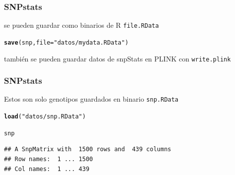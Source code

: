 \documentclass{beamer}\usepackage[]{graphicx}\usepackage[]{color}
\makeatletter
\newcommand{\hlstr}[1]{\textcolor[rgb]{0.192,0.494,0.8}{#1}}%
\newcommand{\hlstd}[1]{\textcolor[rgb]{0.345,0.345,0.345}{#1}}%
\newcommand{\hlkwc}[1]{\textcolor[rgb]{0.333,0.667,0.333}{#1}}%
\newcommand{\hlkwd}[1]{\textcolor[rgb]{0.737,0.353,0.396}{\textbf{#1}}}%
\newenvironment{kframe}{%
 \def\at@end@of@kframe{}%
 \ifinner\ifhmode%
  \def\at@end@of@kframe{\end{minipage}}%
  \begin{minipage}{\columnwidth}%
 \fi\fi%
 \def\FrameCommand##1{\hskip\@totalleftmargin \hskip-\fboxsep
 \colorbox{shadecolor}{##1}\hskip-\fboxsep
     \hskip-\linewidth \hskip-\@totalleftmargin \hskip\columnwidth}%
 \MakeFramed {\advance\hsize-\width
   \@totalleftmargin\z@ \linewidth\hsize
   \@setminipage}}%
 {\par\unskip\endMakeFramed%
 \at@end@of@kframe}
\newenvironment{knitrout}{}{} %
\makeatother
\begin{document}
\begin{frame}[fragile]
\frametitle{SNPstats}
se pueden guardar como binarios de R {\tt file.RData}
\begin{knitrout}\footnotesize
{}\color{fgcolor}\begin{kframe}
\begin{alltt}
\hlkwd{save}\hlstd{(snp,} \hlkwc{file}\hlstd{=}\hlstr{"datos/mydata.RData"}\hlstd{)}
\end{alltt}
\end{kframe}
\end{knitrout}

tambi\'en se pueden guardar datos de snpStats en PLINK con {\tt write.plink}
\end{frame}


\begin{frame}[fragile]
\frametitle{SNPstats}

Estos son solo genotipos guardados en binario {\tt snp.RData} 
\begin{knitrout}\footnotesize
{}\color{fgcolor}\begin{kframe}
\begin{alltt}
\hlkwd{load}\hlstd{(}\hlstr{"datos/snp.RData"}\hlstd{)}
\end{alltt}
\end{kframe}
\end{knitrout}

\begin{knitrout}\footnotesize
{}\color{fgcolor}\begin{kframe}
\begin{alltt}
\hlstd{snp}
\end{alltt}
\begin{verbatim}
## A SnpMatrix with  1500 rows and  439 columns
## Row names:  1 ... 1500 
## Col names:  1 ... 439
\end{verbatim}
\end{kframe}
\end{knitrout}

\end{frame}
\end{document}
